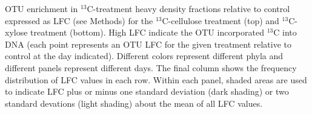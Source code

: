OTU enrichment in $^{13}$C-treatment heavy density fractions relative to
control expressed as LFC (see Methods) for the $^{13}$C-cellulose treatment
(top) and $^{13}$C-xylose treatment (bottom). High LFC indicate the OTU
incorporated $^{13}$C into DNA (each point represents an OTU LFC for the given
treatment relative to control at the day indicated). Different colors
represent different phyla and different panels represent different days. The
final column shows the frequency distribution of LFC values in each row. Within
each panel, shaded areas are used to indicate LFC plus or minus one standard
deviation (dark shading) or two standard devations (light shading) about the
mean of all LFC values.
    
    
